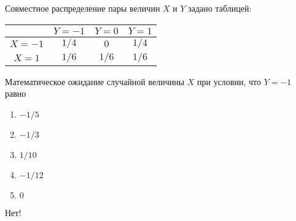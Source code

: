 \documentclass[t]{beamer}
\begin{document}
 \begin{frame} \label{13-No} 
\begin{block}{13} 

Совместное распределение пары величин $X$ и $Y$ задано таблицей:
\begin{center}
\begin{tabular}{@{}c|ccc@{}}
\toprule
       & $Y=-1$ & $Y=0$ & $Y=1$ \\ \midrule
$X=-1$ & $1/4$  & $0$   & $1/4$ \\
$X=1$  & $1/6$  & $1/6$ & $1/6$ \\ \bottomrule
\end{tabular}
\end{center}
\vspace{0.5cm} 
 
 
Математическое ожидание случайной величины $X$ при условии, что $Y=-1$ равно
 


 \end{block} 
\begin{enumerate} 
\item[] \hyperlink{13-Yes}{\beamergotobutton{} $-1/5$}
\item[] \hyperlink{13-No}{\beamergotobutton{} $-1/3$}
\item[] \hyperlink{13-No}{\beamergotobutton{} $1/10$
}
\item[] \hyperlink{13-No}{\beamergotobutton{} $-1/12$}
\item[] \hyperlink{13-No}{\beamergotobutton{} $0$}
\end{enumerate} 

 \alert{Нет!} 
\end{frame} 
\end{document}
